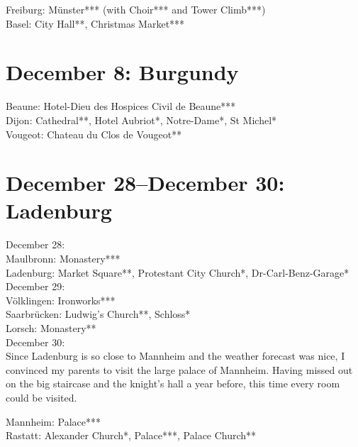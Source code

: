 Freiburg: M\"unster*** (with Choir*** and Tower Climb***)\\
Basel: City Hall**, Christmas Market***

\section{December 8: Burgundy}
\label{Burgundy2018}

Beaune: Hotel-Dieu des Hospices Civil de Beaune***\\
Dijon: Cathedral**, Hotel Aubriot*, Notre-Dame*, St Michel*\\
Vougeot: Chateau du Clos de Vougeot**

\section{December 28--December 30: Ladenburg}
\label{2018Ladenburg}

December 28:\\
Maulbronn: Monastery***\\
Ladenburg: Market Square**, Protestant City Church*, Dr-Carl-Benz-Garage*\\

December 29:\\
V\"olklingen: Ironworks***\\
Saarbr\"ucken: Ludwig's Church**, Schloss*\\
Lorsch: Monastery**\\

December 30:\\
Since Ladenburg is so close to Mannheim and the weather forecast was nice, I convinced my parents to visit the large palace of Mannheim. Having missed out on the big staircase and the knight's hall a year before, this time every room could be visited. 

Mannheim: Palace***\\
Rastatt: Alexander Church*, Palace***, Palace Church**